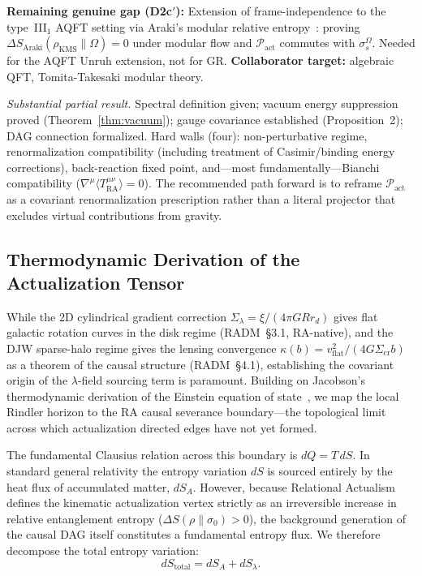 \documentclass[11pt,a4paper]{article}
\theoremstyle{plain}
\theoremstyle{definition}
\theoremstyle{remark}
\newcommand{\Pact}{\mathcal{P}_{\mathrm{act}}}
\newcommand{\Tact}{T^{\mu\nu}_{\mathrm{RA}}}
\begin{document}
\begin{description}
  \textbf{Remaining genuine gap (D2c$'$):} Extension of frame-independence
  to the type~III$_1$ AQFT setting via Araki's modular relative
  entropy~\citep{Araki1976}: proving $\Delta S_{\mathrm{Araki}}(\rho_{\mathrm{KMS}}
  \| \Omega) = 0$ under modular flow and $\Pact$ commutes with
  $\sigma_s^{\Omega}$. Needed for the AQFT Unruh extension, not for GR.
  \textbf{Collaborator target:} algebraic QFT, Tomita-Takesaki modular theory.

  \item[Derivation 3 ($\Pact$ Type-Constraint).] \textit{Substantial partial result.}
  Spectral definition given; vacuum energy suppression proved
  (Theorem~\ref{thm:vacuum}); gauge covariance established (Proposition~2); DAG
  connection formalized. Hard walls (four): non-perturbative regime, renormalization
  compatibility (including treatment of Casimir/binding energy corrections),
  back-reaction fixed point, and---most fundamentally---Bianchi compatibility
  ($\nabla^{\mu}\langle\Tact\rangle = 0$). The recommended path forward is to
  reframe $\Pact$ as a covariant renormalization prescription rather than a
  literal projector that excludes virtual contributions from gravity.


\subsection{Thermodynamic Derivation of the Actualization Tensor}
\label{sec:thermo_derivation}

While the 2D cylindrical gradient correction
$\Sigma_\lambda = \xi/(4\pi G R r_d)$ gives flat galactic rotation curves
in the disk regime (RADM~\S3.1, RA-native), and the DJW sparse-halo regime
gives the lensing convergence $\kappa(b) = v_\mathrm{flat}^2/(4G\Sigma_\mathrm{cr}b)$
as a theorem of the causal structure (RADM~\S4.1), establishing the covariant
origin of the $\lambda$-field sourcing term is paramount. Building on Jacobson's thermodynamic derivation of the Einstein
equation of state~\citep{Jacobson1995}, we map the local Rindler horizon to the
RA causal severance boundary---the topological limit across which actualization
directed edges have not yet formed.

The fundamental Clausius relation across this boundary is $dQ = T\,dS$. In
standard general relativity the entropy variation $dS$ is sourced entirely by the
heat flux of accumulated matter, $dS_A$. However, because Relational Actualism
defines the kinematic actualization vertex strictly as an irreversible increase in
relative entanglement entropy ($\Delta S(\rho\|\sigma_0) > 0$), the background
generation of the causal DAG itself constitutes a fundamental entropy flux. We
therefore decompose the total entropy variation:
\begin{equation}
  dS_{\mathrm{total}} = dS_A + dS_\lambda.
\end{equation}


\end{description}
\end{document}
